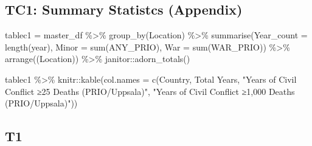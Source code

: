 \documentclass[
]{article}
\newenvironment{Shaded}{\begin{snugshade}}{\end{snugshade}}
\newcommand{\AttributeTok}[1]{\textcolor[rgb]{0.77,0.63,0.00}{#1}}
\newcommand{\FunctionTok}[1]{\textcolor[rgb]{0.00,0.00,0.00}{#1}}
\newcommand{\NormalTok}[1]{#1}
\newcommand{\OtherTok}[1]{\textcolor[rgb]{0.56,0.35,0.01}{#1}}
\newcommand{\SpecialCharTok}[1]{\textcolor[rgb]{0.00,0.00,0.00}{#1}}
\newcommand{\StringTok}[1]{\textcolor[rgb]{0.31,0.60,0.02}{#1}}
\begin{document}
\hypertarget{tc1-summary-statistcs-appendix}{%
\subsection{TC1: Summary Statistcs
(Appendix)}\label{tc1-summary-statistcs-appendix}}

\begin{Shaded}
\begin{Highlighting}[]
\NormalTok{tablec1 }\OtherTok{=}\NormalTok{ master\_df }\SpecialCharTok{\%\textgreater{}\%} 
  \FunctionTok{group\_by}\NormalTok{(Location) }\SpecialCharTok{\%\textgreater{}\%} 
  \FunctionTok{summarise}\NormalTok{(}\AttributeTok{Year\_count =} \FunctionTok{length}\NormalTok{(year),}
            \AttributeTok{Minor =} \FunctionTok{sum}\NormalTok{(ANY\_PRIO), }
            \AttributeTok{War =} \FunctionTok{sum}\NormalTok{(WAR\_PRIO)) }\SpecialCharTok{\%\textgreater{}\%} 
  \FunctionTok{arrange}\NormalTok{((Location)) }\SpecialCharTok{\%\textgreater{}\%} 
\NormalTok{  janitor}\SpecialCharTok{::}\FunctionTok{adorn\_totals}\NormalTok{()}



\NormalTok{tablec1 }\SpecialCharTok{\%\textgreater{}\%}\NormalTok{ knitr}\SpecialCharTok{::}\FunctionTok{kable}\NormalTok{(}\AttributeTok{col.names =} \FunctionTok{c}\NormalTok{(}\StringTok{\textquotesingle{}Country\textquotesingle{}}\NormalTok{, }\StringTok{\textquotesingle{}Total Years\textquotesingle{}}\NormalTok{, }\StringTok{"Years of Civil Conﬂict ≥25 Deaths (PRIO/Uppsala)"}\NormalTok{, }\StringTok{"Years of Civil Conﬂict ≥1,000 Deaths (PRIO/Uppsala)"}\NormalTok{))}
\end{Highlighting}
\end{Shaded}

\hypertarget{t1}{%
\subsection{T1}\label{t1}}
\end{document}
